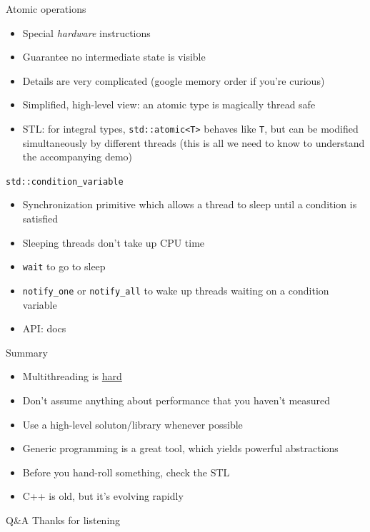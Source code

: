 \documentclass{beamer}
\begin{document}
\begin{frame}{Atomic operations}
\begin{itemize}
\item Special \textit{hardware} instructions
\item Guarantee no intermediate state is visible
\item Details are very complicated (google memory order if you're curious)
\item Simplified, high-level view: an atomic type is magically thread safe
\item STL: for integral types, \texttt{std::atomic<T>} behaves like \texttt{T}, but can be modified simultaneously by different threads (this is all we need to know to understand the accompanying demo)
\end{itemize}
\end{frame}

\begin{frame}{\texttt{std::condition\_variable}}
\begin{itemize}
\item Synchronization primitive which allows a thread to sleep until a condition is satisfied
\item Sleeping threads don't take up CPU time
\item \texttt{wait} to go to sleep
\item \texttt{notify\_one} or \texttt{notify\_all} to wake up threads waiting on a condition variable
\item API: docs
\end{itemize}
\end{frame}

\begin{frame}{Summary}
\begin{itemize}
\item Multithreading is \underline{hard}
\item Don't assume anything about performance that you haven't measured
\item Use a high-level soluton/library whenever possible
\end{itemize}
\vfill
\begin{itemize}
\item Generic programming is a great tool, which yields powerful abstractions
\item Before you hand-roll something, check the STL
\item C++ is old, but it's evolving rapidly
\end{itemize}
\end{frame}

\appendix
\begin{frame}{Q\&A}
    \alert{Thanks for listening}
\end{frame}
\end{document}
